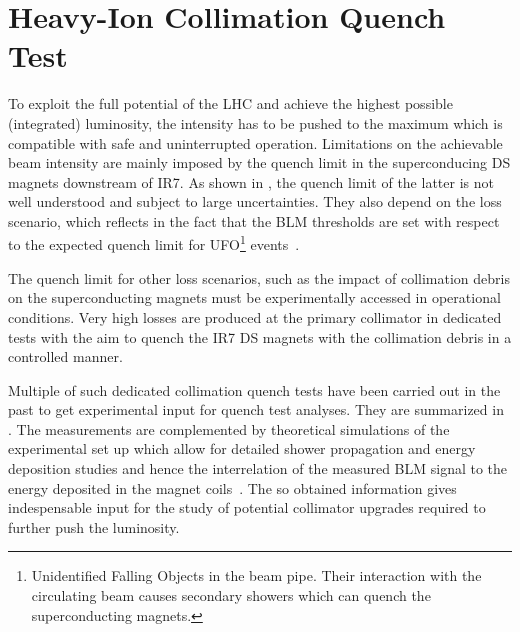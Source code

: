 \section{Heavy-Ion Collimation Quench Test} \label{chapter:quenchtest}



To exploit the full potential of the LHC and achieve the highest possible (integrated) luminosity, the intensity has to be pushed to the maximum which is compatible with safe and uninterrupted operation. Limitations on the achievable beam intensity are mainly imposed by the quench limit in the superconducing DS magnets downstream of IR7. As shown in , the quench limit of the latter is not well understood and subject to large uncertainties. They also depend on the loss scenario, which reflects in the fact that the BLM thresholds are set with respect to the expected quench limit for UFO\footnote{Unidentified Falling Objects in the beam pipe. Their interaction with the circulating beam causes secondary showers which can quench the superconducting magnets.} events~\cite{}. 

The quench limit for other loss scenarios, such as the impact of collimation debris on the superconducting magnets must be experimentally accessed in operational conditions. Very high losses are produced at the primary collimator in dedicated tests with the aim to quench the IR7 DS magnets with the collimation debris in a controlled manner. 

Multiple of such dedicated collimation quench tests have been carried out in the past to get experimental input for quench test analyses. They are summarized in . The measurements are complemented by theoretical simulations of the experimental set up which allow for detailed shower propagation and energy deposition studies and hence the interrelation of the measured BLM signal to the energy deposited in the magnet coils~\cite{IPAC15:TUPTY046}. The so obtained information gives indespensable input for the study of potential collimator upgrades required to further push the luminosity. 

